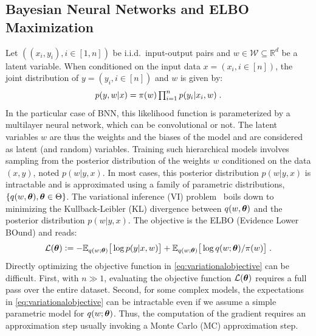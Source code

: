 \documentclass[tablecaption=bottom,wcp]{jmlr}
\begin{document}
\subsection{Bayesian Neural Networks and ELBO Maximization}\label{sec:modelbnn}
Let $((x_i,y_i), i \in [1,n])$ be i.i.d.~input-output pairs and $w \in \mathcal{W} \subseteq \mathbb{R}^{d}$ be a latent variable. 
When conditioned on the input data $x = (x_i, i \in [n])$, the joint distribution of $y = (y_i, i \in [n])$ and $w$ is given by:
\begin{equation}\label{eq:vi} \textstyle
    p(y,w | x) = \prior(w)\prod_{i=1}^{n}{p(y_i | x_i, w)} \eqsp.
\end{equation}
In the particular case of BNN, this likelihood function is parameterized by a multilayer neural network, which can be convolutional or not.
The latent variables $w$ are thus the weights and the biases of the model and are considered as latent (and random) variables.
Training such hierarchical models involves sampling from the posterior distribution of the weights $w$ conditioned on the data $(x,y)$, noted $p(w|y,x)$.
In most cases, this posterior distribution $p(w|y,x)$ is intractable and is approximated using a family of parametric distributions, $\{q(w, \param ), \param \in \Param \}$. 
The variational inference (VI) problem~\citep{blei2017variational} boils down to minimizing the Kullback-Leibler (KL) divergence between $q(w, \param )$ and the posterior distribution $p(w|y,x)$. 
The objective is the ELBO (Evidence Lower BOund) and reads:
\begin{equation}\label{eq:variationalobjective}
{\cal L}(\param) \eqdef -\EE_{ q( w; \param )} \big[\log p(y | x, w) \big]+  \EE_{ q( w; \param )} \big[ \log q(w; \param )/\prior(w) \big]  \eqsp.
\end{equation}
Directly optimizing the objective function in \eqref{eq:variationalobjective} can be difficult.
First, with $n \gg 1$, evaluating the objective function ${\cal L}( \param )$ requires a full pass over the entire dataset.
Second, for some complex models, the expectations in \eqref{eq:variationalobjective} can be intractable even if we assume a simple parametric model for $q(w; \param)$.
Thus, the computation of the gradient requires an approximation step usually invoking a Monte Carlo (MC) approximation step. 
\end{document}
